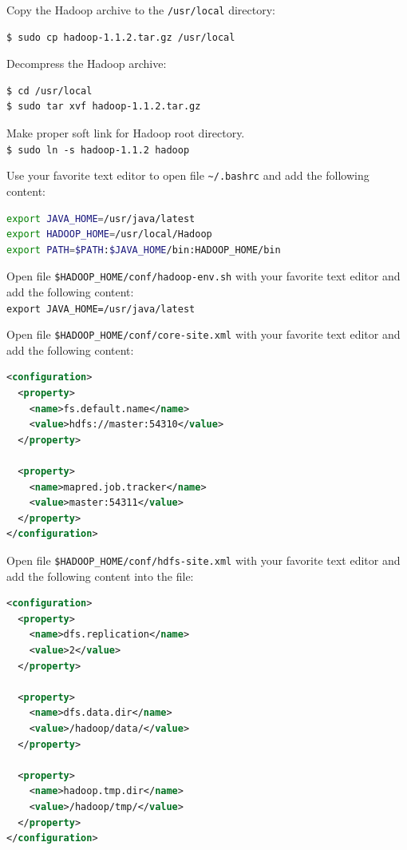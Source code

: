 Copy the Hadoop archive to the \verb|/usr/local| directory:
\lstset{style=bashstyle}
\begin{lstlisting}[language=bash]
$ sudo cp hadoop-1.1.2.tar.gz /usr/local
\end{lstlisting}

Decompress the Hadoop archive:
\lstset{style=bashstyle}
\begin{lstlisting}[language=bash]
$ cd /usr/local
$ sudo tar xvf hadoop-1.1.2.tar.gz
\end{lstlisting}

Make proper soft link for Hadoop root directory. \\
\verb|$ sudo ln -s hadoop-1.1.2 hadoop|

Use your favorite text editor to open file \verb|~/.bashrc| and add the following content:
\lstset{style=bashstyle}
\begin{lstlisting}[language=bash]
export JAVA_HOME=/usr/java/latest
export HADOOP_HOME=/usr/local/Hadoop
export PATH=$PATH:$JAVA_HOME/bin:HADOOP_HOME/bin
\end{lstlisting}

Open file \verb|$HADOOP_HOME/conf/hadoop-env.sh| with your favorite text editor and add the following content: \\
\verb|export JAVA_HOME=/usr/java/latest|

Open file \verb|$HADOOP_HOME/conf/core-site.xml| with your favorite text editor and add the following content:
\lstset{style=bashstyle}
\begin{lstlisting}[language=XML]
<configuration>
  <property>
    <name>fs.default.name</name>
    <value>hdfs://master:54310</value>
  </property>

  <property>
    <name>mapred.job.tracker</name>
    <value>master:54311</value>
  </property>
</configuration>
\end{lstlisting}

Open file \verb|$HADOOP_HOME/conf/hdfs-site.xml| with your favorite text editor and add the following content into the file:
\lstset{style=bashstyle}
\begin{lstlisting}[language=XML]
<configuration>
  <property>
    <name>dfs.replication</name>
    <value>2</value>
  </property>

  <property>
    <name>dfs.data.dir</name>
    <value>/hadoop/data/</value>
  </property>

  <property>
    <name>hadoop.tmp.dir</name>
    <value>/hadoop/tmp/</value>
  </property>
</configuration>
\end{lstlisting}

